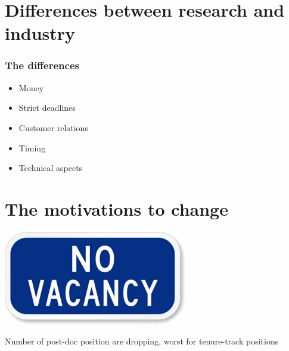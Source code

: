 \documentclass[]{beamer}
\begin{document}
\section[Differences]{Differences between research and industry}
\begin{frame}
\frametitle{The differences}
\begin{itemize}
\item Money
\item Strict deadlines
\item Customer relations
\item Timing
\item Technical aspects
\end{itemize}
\end{frame}

\section[Motivations]{The motivations to change}
%

\begin{frame}
\centering
\includegraphics[width=0.6\textwidth]{No-Vacancy-Sign}

Number of post-doc position are dropping, worst for tenure-track positions
\end{frame}
\end{document}
